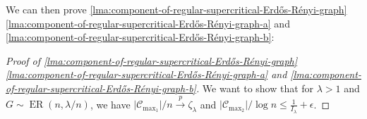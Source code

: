 We can then prove \autoref{lma:component-of-regular-supercritical-Erdős-Rényi-graph} \autoref{lma:component-of-regular-supercritical-Erdős-Rényi-graph-a} and \autoref{lma:component-of-regular-supercritical-Erdős-Rényi-graph-b}:

\begin{proof}[Proof of \autoref{lma:component-of-regular-supercritical-Erdős-Rényi-graph} \autoref{lma:component-of-regular-supercritical-Erdős-Rényi-graph-a} and \autoref{lma:component-of-regular-supercritical-Erdős-Rényi-graph-b}]
	We want to show that for \(\lambda > 1\) and \(G \sim \operatorname{ER}(n, \lambda / n) \), we have \(\lvert \mathcal{C} _{\max _1} \rvert / n \overset{p}{\to} \zeta _\lambda\) and \(\lvert \mathcal{C} _{\max _2} \rvert / \log n \leq \frac{1}{I _\lambda } + \epsilon \).
\end{proof}